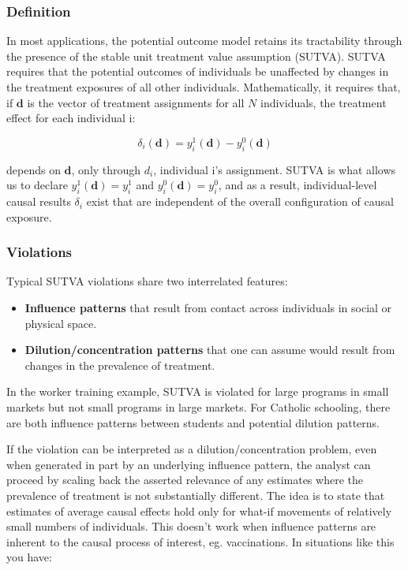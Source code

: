 \documentclass[12 pt, leqno]{article}
\begin{document}
\subsubsection{Definition}

In most applications, the potential outcome model retains its tractability through the presence of the stable unit treatment value assumption (SUTVA). SUTVA requires that the potential outcomes of individuals be unaffected by changes in the treatment exposures of all other individuals. Mathematically, it requires that, if $\textbf{d}$ is the vector of treatment assignments for all $N$ individuals, the treatment effect for each individual i:

$$\delta_i(\textbf{d}) = y_i^1(\textbf{d}) - y_i^0(\textbf{d})$$

depends on $\textbf{d}$, only through $d_i$, individual i's assignment. SUTVA is what allows us to declare $y_i^1(\textbf{d}) = y_i^1$ and $y_i^0(\textbf{d})=y_i^0$, and as a result, individual-level causal results $\delta_i$ exist that are independent of the overall configuration of causal exposure.

\subsubsection{Violations}

Typical SUTVA violations share two interrelated features:

\begin{itemize}
\item \textbf{Influence patterns} that result from contact across individuals in social or physical space.

\item \textbf{Dilution/concentration patterns} that one can assume would result from changes in the prevalence of treatment. 
\end{itemize}

In the worker training example, SUTVA is violated for large programs in small markets but not small programs in large markets. For Catholic schooling, there are both influence patterns between students and potential dilution patterns.

If the violation can be interpreted as a dilution/concentration problem, even when generated in part by an underlying influence pattern, the analyst can proceed by scaling back the asserted relevance of any estimates where the prevalence of treatment is not substantially different. The idea is to state that estimates of average causal effects hold only for what-if movements of relatively small numbers of individuals. This doesn't work when influence patterns are inherent to the causal process of interest, eg. vaccinations. In situations like this you have:
\end{document}
